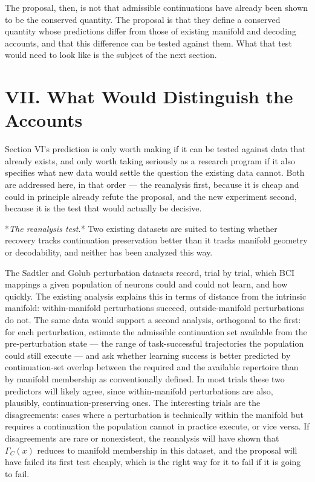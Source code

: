 \documentclass[11pt]{article}
\begin{document}
The proposal, then, is not that admissible continuations have already been shown to be the conserved quantity. The proposal is that they define a conserved quantity whose predictions differ from those of existing manifold and decoding accounts, and that this difference can be tested against them. What that test would need to look like is the subject of the next section.
\section*{VII. What Would Distinguish the Accounts}

Section VI's prediction is only worth making if it can be tested against data that already exists, and only worth taking seriously as a research program if it also specifies what new data would settle the question the existing data cannot. Both are addressed here, in that order — the reanalysis first, because it is cheap and could in principle already refute the proposal, and the new experiment second, because it is the test that would actually be decisive.

*\textit{The reanalysis test.}* Two existing datasets are suited to testing whether recovery tracks continuation preservation better than it tracks manifold geometry or decodability, and neither has been analyzed this way.

The Sadtler and Golub perturbation datasets record, trial by trial, which BCI mappings a given population of neurons could and could not learn, and how quickly. The existing analysis explains this in terms of distance from the intrinsic manifold: within-manifold perturbations succeed, outside-manifold perturbations do not. The same data would support a second analysis, orthogonal to the first: for each perturbation, estimate the admissible continuation set available from the pre-perturbation state — the range of task-successful trajectories the population could still execute — and ask whether learning success is better predicted by continuation-set overlap between the required and the available repertoire than by manifold membership as conventionally defined. In most trials these two predictors will likely agree, since within-manifold perturbations are also, plausibly, continuation-preserving ones. The interesting trials are the disagreements: cases where a perturbation is technically within the manifold but requires a continuation the population cannot in practice execute, or vice versa. If disagreements are rare or nonexistent, the reanalysis will have shown that $\Gamma_C(x)$ reduces to manifold membership in this dataset, and the proposal will have failed its first test cheaply, which is the right way for it to fail if it is going to fail.
\end{document}
